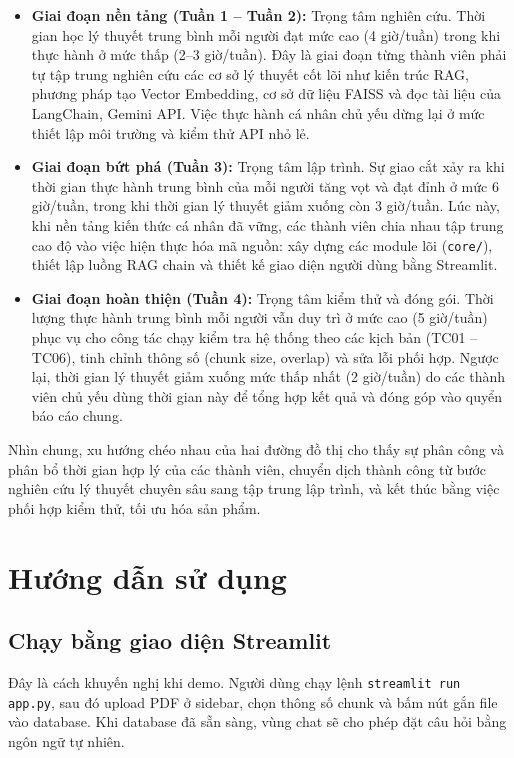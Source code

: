 \documentclass[10pt, conference, a4paper, compsocconf]{IEEEtran}
\begin{document}
\begin{itemize}
    \item \textbf{Giai đoạn nền tảng (Tuần 1 -- Tuần 2):} Trọng tâm nghiên cứu. Thời gian học lý thuyết trung bình mỗi người đạt mức cao (4 giờ/tuần) trong khi thực hành ở mức thấp (2--3 giờ/tuần). Đây là giai đoạn từng thành viên phải tự tập trung nghiên cứu các cơ sở lý thuyết cốt lõi như kiến trúc RAG, phương pháp tạo Vector Embedding, cơ sở dữ liệu FAISS và đọc tài liệu của LangChain, Gemini API. Việc thực hành cá nhân chủ yếu dừng lại ở mức thiết lập môi trường và kiểm thử API nhỏ lẻ.
    
    \item \textbf{Giai đoạn bứt phá (Tuần 3):} Trọng tâm lập trình. Sự giao cắt xảy ra khi thời gian thực hành trung bình của mỗi người tăng vọt và đạt đỉnh ở mức 6 giờ/tuần, trong khi thời gian lý thuyết giảm xuống còn 3 giờ/tuần. Lúc này, khi nền tảng kiến thức cá nhân đã vững, các thành viên chia nhau tập trung cao độ vào việc hiện thực hóa mã nguồn: xây dựng các module lõi (\texttt{core/}), thiết lập luồng RAG chain và thiết kế giao diện người dùng bằng Streamlit.
    
    \item \textbf{Giai đoạn hoàn thiện (Tuần 4):} Trọng tâm kiểm thử và đóng gói. Thời lượng thực hành trung bình mỗi người vẫn duy trì ở mức cao (5 giờ/tuần) phục vụ cho công tác chạy kiểm tra hệ thống theo các kịch bản (TC01 -- TC06), tinh chỉnh thông số (chunk size, overlap) và sửa lỗi phối hợp. Ngược lại, thời gian lý thuyết giảm xuống mức thấp nhất (2 giờ/tuần) do các thành viên chủ yếu dùng thời gian này để tổng hợp kết quả và đóng góp vào quyển báo cáo chung.
\end{itemize}

Nhìn chung, xu hướng chéo nhau của hai đường đồ thị cho thấy sự phân công và phân bổ thời gian hợp lý của các thành viên, chuyển dịch thành công từ bước nghiên cứu lý thuyết chuyên sâu sang tập trung lập trình, và kết thúc bằng việc phối hợp kiểm thử, tối ưu hóa sản phẩm.

\section{Hướng dẫn sử dụng}
\subsection{Chạy bằng giao diện Streamlit}
Đây là cách khuyến nghị khi demo. Người dùng chạy lệnh \verb|streamlit run app.py|, sau đó upload PDF ở sidebar, chọn thông số chunk và bấm nút gắn file vào database. Khi database đã sẵn sàng, vùng chat sẽ cho phép đặt câu hỏi bằng ngôn ngữ tự nhiên.
\end{document}
